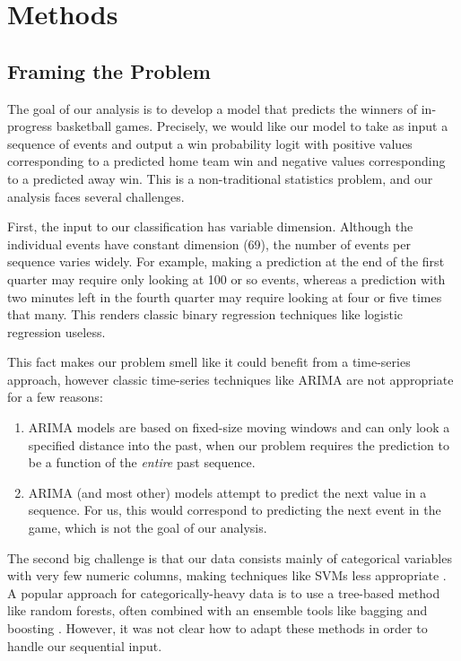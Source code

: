 \section{Methods}
\label{sec:methods}

\subsection{Framing the Problem}

The goal of our analysis is to develop a model that predicts the winners of in-progress basketball games. Precisely, we would like our model to take as input a sequence of events and output a win probability logit with positive values corresponding to a predicted home team win and negative values corresponding to a predicted away win. This is a non-traditional statistics problem, and our analysis faces several challenges.

First, the input to our classification has variable dimension. Although the individual events have constant dimension (69), the number of events per sequence varies widely. For example, making a prediction at the end of the first quarter may require only looking at 100 or so events, whereas a prediction with two minutes left in the fourth quarter may require looking at four or five times that many. This renders classic binary regression techniques like logistic regression useless.

This fact makes our problem smell like it could benefit from a time-series approach, however classic time-series techniques like ARIMA are not appropriate for a few reasons:
\begin{enumerate}
	\item ARIMA models are based on fixed-size moving windows and can only look a specified distance into the past, when our problem requires the prediction to be a function of the \emph{entire} past sequence.
	\item ARIMA (and most other) models attempt to predict the next value in a sequence. For us, this would correspond to predicting the next event in the game, which is not the goal of our analysis.
\end{enumerate}

The second big challenge is that our data consists mainly of categorical variables with very few numeric columns, making techniques like SVMs less appropriate \cite{ISL}. A popular approach for categorically-heavy data is to use a tree-based method like random forests, often combined with an ensemble tools like bagging and boosting \cite{ESL}. However, it was not clear how to adapt these methods in order to handle our sequential input.

